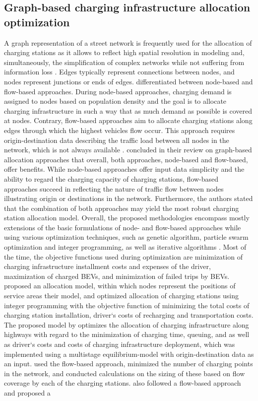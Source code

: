 \documentclass[journal,article,submit,pdftex,moreauthors]{Definitions/mdpi}
\begin{document}
    \subsection{Graph-based charging infrastructure allocation optimization}
    A graph representation of a street network is frequently used for the allocation of charging stations as it allows to reflect high spatial resolution in modeling and, simultaneously, the simplification of complex networks while not suffering from information loss \citep{Metais2022, Pagany2019}. Edges typically represent connections between nodes, and nodes represent junctions or ends of edges. \citet{Metais2022} differentiated between node-based and flow-based approaches. During node-based approaches, charging demand is assigned to nodes based on population density and the goal is to allocate charging infrastructure in such a way that as much demand as possible is covered at nodes. Contrary, flow-based approaches aim to allocate charging stations along edges through which the highest vehicles flow occur. This approach requires origin-destination data describing the traffic load between all nodes in the network, which is not always available \citep[][]{Ghamami2016}. \citet{Metais2022} concluded in their review on graph-based allocation approaches that overall, both approaches, node-based and flow-based, offer benefits. While node-based approaches offer input data simplicity and the ability to regard the charging capacity of charging stations, flow-based approaches succeed in reflecting the nature of traffic flow between nodes illustrating origin or destinations in the network. Furthermore, the authors stated that the combination of both approaches may yield the most robust charging station allocation model. Overall, the proposed methodologies encompass mostly extensions of the basic formulations of node- and flow-based approaches while using various optimization techniques, such as genetic algorithm, particle swarm optimization and integer programming, as well as iterative algorithms \citep{SHAREEF2016403}. Most of the time, the objective functions used during optimization are minimization of charging infrastructure installment costs and expenses of the driver, maximization of charged BEVs, and minimization of failed trips by BEVs. \citet{6183279} proposed an allocation model, within which nodes represent the positions of service areas  their model, and optimized allocation of charging stations using integer programming with the objective function of minimizing the total costs of charging station installation, driver`s costs of recharging and transportation costs. The proposed model by \citet{Wang2018} optimizes the allocation of charging infrastructure along highways with regard to the minimization of charging time, queuing, and as well as driver`s costs and costs of charging infrastructure deployment, which was implemented using a multistage equilibrium-model with origin-destination data as an input. \citet{Jochem2019} used the flow-based approach, minimized the number of charging points in the network, and conducted calculations on the sizing of these based on flow coverage by each of the charging stations. \citet{7575934} also followed a flow-based approach and proposed a 
\end{document}
